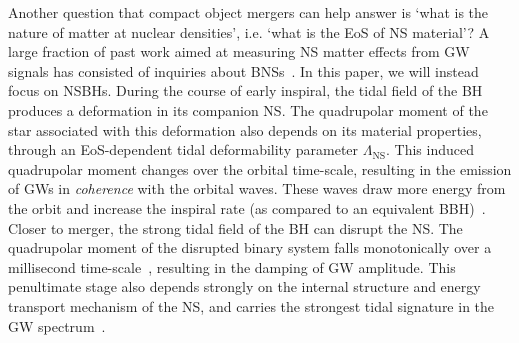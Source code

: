 \documentclass[aps,prd,amsmath,floats,floatfix, twocolumn,
superscriptaddress,nofootinbib,showpacs]{revtex4-1}
\newcommand{\red}{\textcolor{red}}
\newcommand{\lambdans}{\Lambda_\mathrm{NS}}
\begin{document}

Another question that compact object mergers can help answer is `what is the 
nature of matter at nuclear densities', i.e. `what is the EoS of NS material'?
A large fraction of past work aimed at measuring NS matter effects from GW
signals has consisted of inquiries about BNSs~\cite{Lee1999a,Lee1999b,Lee2000,
oechslin:07,Read:2008iy,Markakis:2010mp,Markakis:2011vd,stergioulas:11,
East:2011xa,Lackey2014,Wade:2014vqa,Bauswein:2014qla}. In this paper, we will
instead focus on NSBHs.
% 
During the course of early inspiral, the tidal field of the BH produces a
deformation in its companion NS. The quadrupolar moment of the star associated
with this deformation also depends on its material properties, through an EoS-dependent
tidal deformability parameter $\lambdans$. This induced quadrupolar moment
changes over the orbital time-scale, resulting in the emission of GWs in {\it
coherence} with the orbital waves.
These waves draw more energy from the orbit and increase the inspiral rate (as
compared to an equivalent BBH)~\cite{Flanagan2008}.
% 
% 
Closer to merger, the strong tidal field of the BH can disrupt the NS. The
quadrupolar moment of the disrupted binary system falls monotonically over a
millisecond time-scale~\cite{Kyutoku:2010zd,Lackey:2013axa,Lovelace:2013vma,
Foucart:2015a,Pannarale:2015jia}, resulting in the damping of GW amplitude.
% 
This penultimate stage also depends strongly on the internal structure and energy
transport mechanism of the NS, and carries the strongest tidal signature in the
GW spectrum~\cite{Foucart:2014nda,Deaton2013}.




% 
\end{document}
